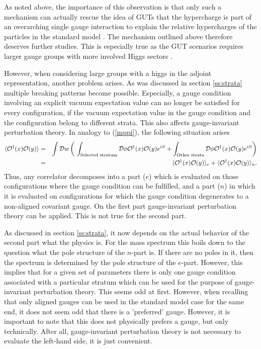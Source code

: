 \documentclass[final,twoside,12pt]{article}
\newcommand*{\no}{\noindent}
\newcommand*{\bea}{\begin{eqnarray}}
\newcommand*{\eea}{\end{eqnarray}}
\newcommand*{\pref}[1]{(\ref{#1})}
\newcommand*{\nn}{\nonumber}
\newcommand*{\1}{1\!\!\!\bot}
\newcommand*{\op}{{\cal O}}
\begin{document}
As noted above, the importance of this observation is that only such a mechanism can actually rescue the idea of GUTs that the hypercharge is part of an overarching single gauge interaction to explain the relative hypercharges of the particles in the standard model \cite{Langacker:1980js}. The mechanism outlined above therefore deserves further studies. This is especially true as the GUT scenarios requires larger gauge groups with more involved Higgs sectors \cite{Langacker:1980js}.

However, when considering large groups with a higgs in the adjoint representation, another problem arises. As was discussed in section \ref{ss:strata} multiple breaking patterns become possible. Especially, a gauge condition involving an explicit vacuum expectation value can no longer be satisfied for every configuration, if the vacuum expectation value in the gauge condition and the configuration belong to different strata. This also affects gauge-invariant perturbation theory. In analogy to \pref{mppi}, the following situation arises \cite{Maas:2017xzh}
\bea
\langle \op^\dagger(x) \op(y)\rangle&=&\int{\cal D}w\left(~\int_\text{Selected stratum}{\cal D}\phi \op^\dagger(x)\op(y)e^{iS}+\int_\text{Other strata}{\cal D}\phi\op^\dagger(x)\op(y)e^{iS}\right)\nonumber\\
&=&\langle \op^\dagger(x)\op(y)\rangle_e+\langle \op^\dagger(x) \op(y)\rangle_n\nn.
\eea
\no Thus, any correlator decomposes into a part ($e$) which is evaluated on those configurations where the gauge condition can be fulfilled, and a part ($n$) in which it is evaluated on configurations for which the gauge condition degenerates to a non-aligned covariant gauge. On the first part gauge-invariant perturbation theory can be applied. This is not true for the second part.

As discussed in section \ref{ss:strata}, it now depends on the actual behavior of the second part what the physics is. For the mass spectrum this boils down to the question what the pole structure of the $n$-part is. If there are no poles in it, then the spectrum is determined by the pole structure of the $e$-part. However, this implies that for a given set of parameters there is only one gauge condition associated with a particular stratum which can be used for the purpose of gauge-invariant perturbation theory. This seems odd at first. However, when recalling that only aligned gauges can be used in the standard model case for the same end, it does not seem odd that there is a 'preferred' gauge. However, it is important to note that this does not physically prefers a gauge, but only technically. After all, gauge-invariant perturbation theory is not necessary to evaluate the left-hand side, it is just convenient.
\end{document}
